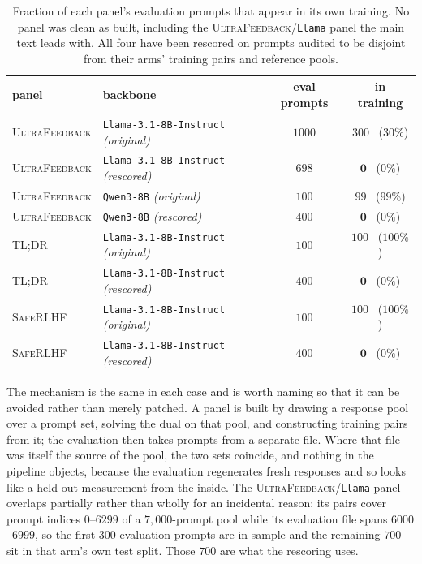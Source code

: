 \documentclass{article}
\theoremstyle{remark}
\theoremstyle{plain}
\begin{document}
\begin{table}[htbp]
\centering\footnotesize
\setlength{\tabcolsep}{5.0pt}
\caption{Fraction of each panel's evaluation prompts that appear in its own training. No panel was
clean as built, including the \textsc{UltraFeedback}/\texttt{Llama} panel the main text leads with. All
four have been rescored on prompts audited to be disjoint from their arms' training pairs and reference
pools.}
\label{tab:overlap-audit}
\begin{tabular}{llcc}
\toprule
panel & backbone & eval prompts & in training\\
\midrule
\textsc{UltraFeedback} & \texttt{Llama-3.1-8B-Instruct} \emph{(original)} & $1000$ & $300$ \ ($30\%$)\\
\textsc{UltraFeedback} & \texttt{Llama-3.1-8B-Instruct} \emph{(rescored)} & $698$ & $\mathbf{0}$ \ ($0\%$)\\
\textsc{UltraFeedback} & \texttt{Qwen3-8B} \emph{(original)} & $100$ & $99$ \ ($99\%$)\\
\textsc{UltraFeedback} & \texttt{Qwen3-8B} \emph{(rescored)} & $400$ & $\mathbf{0}$ \ ($0\%$)\\
\textsc{TL;DR} & \texttt{Llama-3.1-8B-Instruct} \emph{(original)} & $100$ & $100$ \ ($100\%$)\\
\textsc{TL;DR} & \texttt{Llama-3.1-8B-Instruct} \emph{(rescored)} & $400$ & $\mathbf{0}$ \ ($0\%$)\\
\textsc{SafeRLHF} & \texttt{Llama-3.1-8B-Instruct} \emph{(original)} & $100$ & $100$ \ ($100\%$)\\
\textsc{SafeRLHF} & \texttt{Llama-3.1-8B-Instruct} \emph{(rescored)} & $400$ & $\mathbf{0}$ \ ($0\%$)\\
\bottomrule
\end{tabular}
\end{table}

The mechanism is the same in each case and is worth naming so that it can be avoided rather than merely
patched. A panel is built by drawing a response pool over a prompt set, solving the dual on that pool, and
constructing training pairs from it; the evaluation then takes prompts from a separate file. Where that
file was itself the source of the pool, the two sets coincide, and nothing in the pipeline objects, because
the evaluation regenerates fresh responses and so looks like a held-out measurement from the inside. The
\textsc{UltraFeedback}/\texttt{Llama} panel overlaps partially rather than wholly for an incidental reason:
its pairs cover prompt indices $0$--$6299$ of a $7{,}000$-prompt pool while its evaluation file spans
$6000$--$6999$, so the first $300$ evaluation prompts are in-sample and the remaining $700$ sit in that
arm's own test split. Those $700$ are what the rescoring uses.
\end{document}
